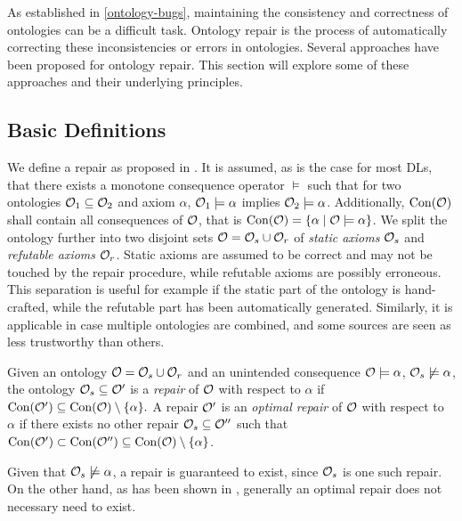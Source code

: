
As established in \cref{ontology-bugs}, maintaining the consistency and correctness of ontologies can be a difficult task. Ontology repair is the process of automatically correcting these inconsistencies or errors in ontologies. Several approaches have been proposed for ontology repair. This section will explore some of these approaches and their underlying principles.

\subsection{Basic Definitions} \label{basic-definitions}

We define a repair as proposed in \cite{baader2018making}. It is assumed, as is the case for most DLs, that there exists a monotone consequence operator $\models$ such that for two ontologies $\mathcal{O}_1 \subseteq \mathcal{O}_2$ and axiom $\alpha$, $\mathcal{O}_1 \models \alpha$ implies $\mathcal{O}_2 \models \alpha$. Additionally, $\operatorname{Con}(\mathcal{O})$ shall contain all consequences of $\mathcal{O}$, that is $\operatorname{Con}(\mathcal{O}) = \{ \alpha \mid \mathcal{O} \models \alpha \}$. We split the ontology further into two disjoint sets $\mathcal{O} = \mathcal{O}_s \cup \mathcal{O}_r$ of \emph{static axioms} $\mathcal{O}_s$ and \emph{refutable axioms} $\mathcal{O}_r$. Static axioms are assumed to be correct and may not be touched by the repair procedure, while refutable axioms are possibly erroneous. This separation is useful for example if the static part of the ontology is hand-crafted, while the refutable part has been automatically generated. Similarly, it is applicable in case multiple ontologies are combined, and some sources are seen as less trustworthy than others.

\begin{definition}
  Given an ontology $\mathcal{O} = \mathcal{O}_s \cup \mathcal{O}_r$ and an unintended consequence $\mathcal{O} \models \alpha$, $\mathcal{O}_s \not\models \alpha$, the ontology $\mathcal{O}_s \subseteq \mathcal{O}'$ is a \emph{repair} of $\mathcal{O}$ with respect to $\alpha$ if $\operatorname{Con}(\mathcal{O}') \subseteq \operatorname{Con}(\mathcal{O}) \setminus \{\alpha\}.$ A repair $\mathcal{O}'$ is an \emph{optimal repair} of $\mathcal{O}$ with respect to $\alpha$ if there exists no other repair $\mathcal{O}_s \subseteq \mathcal{O}''$ such that $\operatorname{Con}(\mathcal{O}') \subset \operatorname{Con}(\mathcal{O}'') \subseteq \operatorname{Con}(\mathcal{O}) \setminus \{\alpha\}$.
\end{definition}

Given that $\mathcal{O}_s \not\models \alpha$, a repair is guaranteed to exist, since $\mathcal{O}_s$ is one such repair. On the other hand, as has been shown in \cite{baader2018making}, generally an optimal repair does not necessary need to exist.

